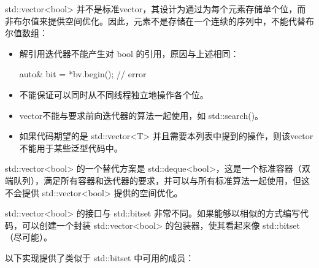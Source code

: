 
std::vector<bool> 并不是标准vector，其设计为通过为每个元素存储单个位，而非布尔值来提供空间优化。因此，元素不是存储在一个连续的序列中，不能代替布尔值数组：

\begin{itemize}
索引操作符不能返回对特定元素的引用，元素不是单独存储的：

\begin{cpp}
std::vector<bool> bv;
bv.resize(10);
auto& bit = bv[0];      // error
\end{cpp}

\item
解引用迭代器不能产生对 bool 的引用，原因与上述相同：

\begin{cpp}
auto& bit = *bv.begin(); // error
\end{cpp}

\item
不能保证可以同时从不同线程独立地操作各个位。

\item
vector不能与要求前向迭代器的算法一起使用，如 std::search()。

\item
如果代码期望的是 std::vector<T> 并且需要本列表中提到的操作，则该vector不能用于某些泛型代码中。
\end{itemize}

std::vector<bool> 的一个替代方案是 std::deque<bool>，这是一个标准容器（双端队列），满足所有容器和迭代器的要求，并可以与所有标准算法一起使用，但这不会提供 std::vector<bool> 提供的空间优化。


std::vector<bool> 的接口与 std::bitset 非常不同。如果能够以相似的方式编写代码，可以创建一个封装 std::vector<bool> 的包装器，使其看起来像 std::bitset（尽可能）。

以下实现提供了类似于 std::bitset 中可用的成员：

